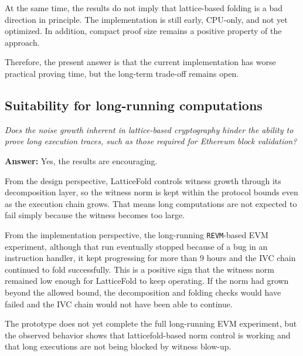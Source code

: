 At the same time, the results do not imply that lattice-based folding is a bad
direction in principle. The implementation is still early, CPU-only, and not yet
optimized. In addition, compact proof size remains a positive property of the
approach.

Therefore, the present answer is that the current implementation has worse
practical proving time, but the long-term trade-off remains open.

\subsection*{Suitability for long-running computations}

\textit{Does the noise growth inherent in lattice-based cryptography hinder the
	ability to prove long execution traces, such as those required for Ethereum block
	validation?}

\textbf{Answer:} Yes, the results are encouraging.

From the design perspective, LatticeFold controls witness growth through its
decomposition layer, so the witness norm is kept within the protocol bounds even
as the execution chain grows. That means long computations are not expected to
fail simply because the witness becomes too large.

From the implementation perspective, the long-running
\texttt{REVM}-based EVM experiment, although that run eventually stopped because
of a bug in an instruction handler, it kept progressing for more than 9 hours
and the IVC chain continued to fold successfully. This is a positive sign that
the witness norm remained low enough for LatticeFold to keep operating. If the
norm had grown beyond the allowed bound, the decomposition and folding checks
would have failed and the IVC chain would not have been able to continue.

The prototype does not yet
complete the full long-running EVM experiment, but the observed behavior shows
that latticefold-based norm control is working and that long executions are not
being blocked by witness blow-up.
